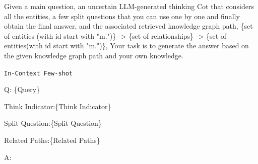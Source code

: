 \begin{center}

\begin{minipage}{0.7\columnwidth}
    \vspace{2mm}
    \begin{tcolorbox}[title= Question Answering Generation Prompt Template]
        \small
Given a main question, an uncertain LLM-generated thinking Cot that considers all the entities, a few split questions that you can use one by one and finally obtain the final answer, and the associated retrieved knowledge graph path, \{set of entities (with id start with "m.")\} -> \{set of relationships\} -> \{set of entities(with id start with "m.")\}, 
Your task is to generate the answer based on the given knowledge graph path and your own knowledge.

\vspace{5pt}
    
\texttt{In-Context Few-shot}

\vspace{5pt}
Q: \{Query\} 

Think Indicator:\{Think Indicator\}

Split Question:\{Split Question\}

Related Paths:\{Related Paths\}

A: 
    \end{tcolorbox}
    \vspace{2mm}
\end{minipage}
\end{center}


